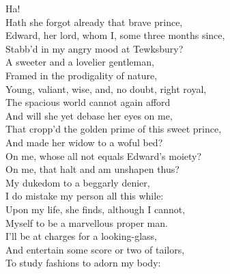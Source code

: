\documentclass{article}
\begin{document}
\begin{description}
\hspace{1pt}Ha!\\
\hspace{1pt}Hath she forgot already that brave prince,\\
\hspace{1pt}Edward, her lord, whom I, some three months since,\\
\hspace{1pt}Stabb'd in my angry mood at Tewksbury?\\
\hspace{1pt}A sweeter and a lovelier gentleman,\\
\hspace{1pt}Framed in the prodigality of nature,\\
\hspace{1pt}Young, valiant, wise, and, no doubt, right royal,\\
\hspace{1pt}The spacious world cannot again afford\\
\hspace{1pt}And will she yet debase her eyes on me,\\
\hspace{1pt}That cropp'd the golden prime of this sweet prince,\\
\hspace{1pt}And made her widow to a woful bed?\\
\hspace{1pt}On me, whose all not equals Edward's moiety?\\
\hspace{1pt}On me, that halt and am unshapen thus?\\
\hspace{1pt}My dukedom to a beggarly denier,\\
\hspace{1pt}I do mistake my person all this while:\\
\hspace{1pt}Upon my life, she finds, although I cannot,\\
\hspace{1pt}Myself to be a marvellous proper man.\\
\hspace{1pt}I'll be at charges for a looking-glass,\\
\hspace{1pt}And entertain some score or two of tailors,\\
\hspace{1pt}To study fashions to adorn my body:\\

\end{description}
\end{document}
